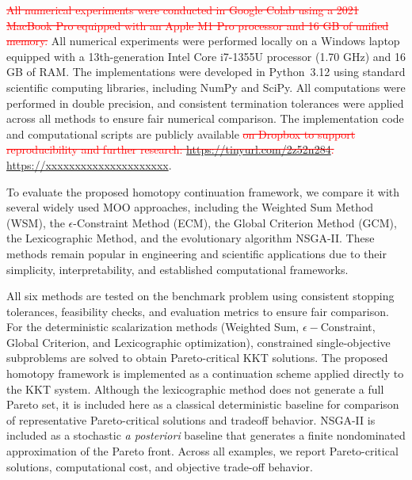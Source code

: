 \documentclass[11pt,pdflatex,sn-mathphys-ay]{sn-jnl}%
\theoremstyle{definition}
\theoremstyle{thmstyleone}%
\theoremstyle{thmstyletwo}%
\theoremstyle{thmstylethree}%
\newcommand{\del}[1]{\textcolor{red}{\sout{#1}}}
\newcommand{\add}[1]{\textcolor{revisionblue}{#1}}
\begin{document}
	
	\del{All numerical experiments were conducted in Google Colab
		using a 2021 MacBook Pro equipped with an Apple M1 Pro
		processor and 16 GB of unified memory.}
	\add{All numerical experiments were performed locally
		on a Windows laptop equipped with a 13th-generation
		Intel Core i7-1355U processor (1.70 GHz) and 16 GB
		of RAM.}
	The implementations were developed in Python~3.12 using standard scientific computing libraries, including NumPy and SciPy. All computations were performed in double precision, and consistent termination tolerances were applied across all methods to ensure fair numerical comparison. The implementation code and computational scripts are publicly available  \del{on Dropbox to support reproducibility and further research:
		\url{https://tinyurl.com/2z52n284}.}
	\add{\url{https://xxxxxxxxxxxxxxxxxxxxx}.}
	
	To evaluate the proposed homotopy continuation framework, we compare it with several widely used MOO approaches, including the Weighted Sum Method (WSM), the $\epsilon$-Constraint Method (ECM), the Global Criterion Method (GCM), the Lexicographic Method, and the evolutionary algorithm NSGA-II. These methods remain popular in engineering and scientific applications due to their simplicity, interpretability, and established computational frameworks.
	
	All six methods are tested on the benchmark problem using consistent stopping tolerances, feasibility checks, and evaluation metrics to ensure fair comparison. For the deterministic scalarization methods (Weighted Sum, $\epsilon-$\add{Constraint}, Global Criterion, and Lexicographic optimization), constrained single-objective subproblems are solved to obtain Pareto-critical KKT solutions. The proposed homotopy framework is implemented as a continuation scheme applied directly to the KKT system. Although the lexicographic method does not generate a full Pareto set, it is included here as a classical deterministic baseline for comparison of representative Pareto-critical solutions and tradeoff behavior. NSGA-II is included as a stochastic \textit{a posteriori} baseline that generates a finite nondominated approximation of the Pareto front. Across all examples, we report Pareto-critical solutions, computational cost, and objective trade-off behavior.
	
\end{document}
